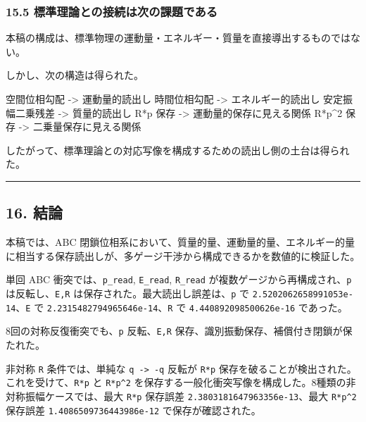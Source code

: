 \documentclass[
  a4paper,
]{article}
\newenvironment{Shaded}{}{}
\newcommand{\NormalTok}[1]{#1}
\begin{document}
\subsubsection{15.5
標準理論との接続は次の課題である}\label{ux6a19ux6e96ux7406ux8ad6ux3068ux306eux63a5ux7d9aux306fux6b21ux306eux8ab2ux984cux3067ux3042ux308b}

本稿の構成は、標準物理の運動量・エネルギー・質量を直接導出するものではない。

しかし、次の構造は得られた。

\begin{Shaded}
\begin{Highlighting}[]
\NormalTok{空間位相勾配 {-}\textgreater{} 運動量的読出し}
\NormalTok{時間位相勾配 {-}\textgreater{} エネルギー的読出し}
\NormalTok{安定振幅二乗残差 {-}\textgreater{} 質量的読出し}
\NormalTok{R*p 保存 {-}\textgreater{} 運動量的保存に見える関係}
\NormalTok{R*p\^{}2 保存 {-}\textgreater{} 二乗量保存に見える関係}
\end{Highlighting}
\end{Shaded}

したがって、標準理論との対応写像を構成するための読出し側の土台は得られた。

\begin{center}\rule{0.5\linewidth}{0.5pt}\end{center}

\subsection{16. 結論}\label{ux7d50ux8ad6}

本稿では、ABC
閉鎖位相系において、質量的量、運動量的量、エネルギー的量に相当する保存読出しが、多ゲージ干渉から構成できるかを数値的に検証した。

単回 ABC 衝突では、\texttt{p\_read}, \texttt{E\_read}, \texttt{R\_read}
が複数ゲージから再構成され、\texttt{p} は反転し、\texttt{E,R}
は保存された。最大読出し誤差は、\texttt{p} で
\texttt{2.5202062658991053e-14}、\texttt{E} で
\texttt{2.2315482794965646e-14}、\texttt{R} で
\texttt{4.440892098500626e-16} であった。

8回の対称反復衝突でも、\texttt{p} 反転、\texttt{E,R}
保存、識別振動保存、補償付き閉鎖が保たれた。

非対称 \texttt{R} 条件では、単純な \texttt{q\ -\textgreater{}\ -q}
反転が \texttt{R*p}
保存を破ることが検出された。これを受けて、\texttt{R*p} と
\texttt{R*p\^{}2}
を保存する一般化衝突写像を構成した。8種類の非対称振幅ケースでは、最大
\texttt{R*p} 保存誤差 \texttt{2.3803181647963356e-13}、最大
\texttt{R*p\^{}2} 保存誤差 \texttt{1.4086509736443986e-12}
で保存が確認された。
\end{document}
